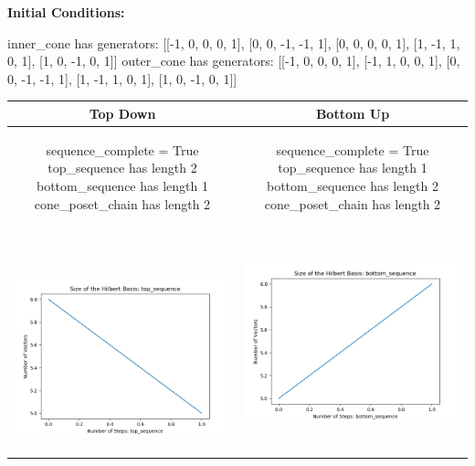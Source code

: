 \documentclass[10pt]{article}
\begin{document}
\textbf{Initial Conditions:}
\begin{SAGE}
inner_cone has generators: 
[[-1, 0, 0, 0, 1], [0, 0, -1, -1, 1], [0, 0, 0, 0, 1], [1, -1, 1, 0, 1], [1, 0, -1, 0, 1]]
outer_cone has generators: 
[[-1, 0, 0, 0, 1], [-1, 1, 0, 0, 1], [0, 0, -1, -1, 1], [1, -1, 1, 0, 1], [1, 0, -1, 0, 1]]

\end{SAGE}
\begin{tabular}{c|c}
\textbf{Top Down} & \textbf{Bottom Up} \\ \hline  
\begin{SAGE}
	sequence_complete = True
	top_sequence has length 2
	bottom_sequence has length 1
	cone_poset_chain has length 2
\end{SAGE} 
&
\begin{SAGE}
	sequence_complete = True
	top_sequence has length 1
	bottom_sequence has length 2
	cone_poset_chain has length 2
\end{SAGE} 
\\ \hline
\
\begin{minipage}{.45\textwidth}
\includegraphics[width=\textwidth]{"DATA/5d/5 generators 1 bound C/top_sequence SIZE"}
\end{minipage} &
\begin{minipage}{.45\textwidth}
\includegraphics[width=\textwidth]{"DATA/5d/5 generators 1 bound C bottomup/bottom_sequence SIZE"}

\end{minipage}
\end{tabular}
\end{document}
